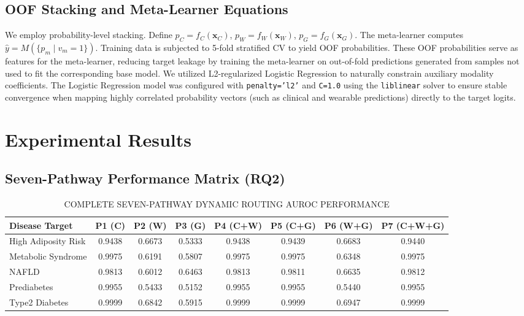 \documentclass[journal, twocolumn]{IEEEtran}
\begin{document}
\subsection{OOF Stacking and Meta-Learner Equations}
We employ probability-level stacking. Define $p_C = f_C(\mathbf{x}_C)$, $p_W = f_W(\mathbf{x}_W)$, $p_G = f_G(\mathbf{x}_G)$. The meta-learner computes $\hat{y} = M(\{p_m \mid v_m = 1\})$.
Training data is subjected to 5-fold stratified CV to yield OOF probabilities. These OOF probabilities serve as features for the meta-learner, reducing target leakage by training the meta-learner on out-of-fold predictions generated from samples not used to fit the corresponding base model. We utilized L2-regularized Logistic Regression to naturally constrain auxiliary modality coefficients. The Logistic Regression model was configured with \texttt{penalty='l2'} and \texttt{C=1.0} using the \texttt{liblinear} solver to ensure stable convergence when mapping highly correlated probability vectors (such as clinical and wearable predictions) directly to the target logits.

\section{Experimental Results}
\subsection{Seven-Pathway Performance Matrix (RQ2)}
\begin{table}[htbp]
\centering
\caption{COMPLETE SEVEN-PATHWAY DYNAMIC ROUTING AUROC PERFORMANCE}
\label{tab:seven_pathway}
\begin{tabular}{@{}l ccccccc @{}}
\toprule
\textbf{Disease Target} & \textbf{P1 (C)} & \textbf{P2 (W)} & \textbf{P3 (G)} & \textbf{P4 (C+W)} & \textbf{P5 (C+G)} & \textbf{P6 (W+G)} & \textbf{P7 (C+W+G)} \\
\midrule
High Adiposity Risk & 0.9438 & 0.6673 & 0.5333 & 0.9438 & 0.9439 & 0.6683 & 0.9440 \\
Metabolic Syndrome & 0.9975 & 0.6191 & 0.5807 & 0.9975 & 0.9975 & 0.6348 & 0.9975 \\
NAFLD & 0.9813 & 0.6012 & 0.6463 & 0.9813 & 0.9811 & 0.6635 & 0.9812 \\
Prediabetes & 0.9955 & 0.5433 & 0.5152 & 0.9955 & 0.9955 & 0.5440 & 0.9955 \\
Type2 Diabetes & 0.9999 & 0.6842 & 0.5915 & 0.9999 & 0.9999 & 0.6947 & 0.9999 \\
\bottomrule
\end{tabular}
\end{table}
\end{document}
